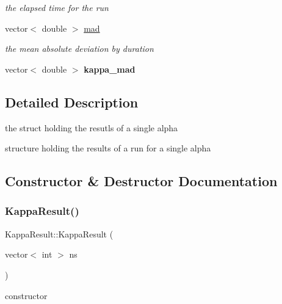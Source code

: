 \begin{DoxyCompactItemize}
\begin{DoxyCompactList}\small\item\em the elapsed time for the run \end{DoxyCompactList}\item 
\mbox{\label{structKappaResult_a43fdcc9f455335e136cb46d2506a14dd}} 
vector$<$ double $>$ \mbox{\hyperlink{structKappaResult_a43fdcc9f455335e136cb46d2506a14dd}{mad}}
\begin{DoxyCompactList}\small\item\em the mean absolute deviation by duration \end{DoxyCompactList}\item 
\mbox{\label{structKappaResult_abdbafd17d772e9821b31905d6389c22f}} 
vector$<$ double $>$ {\bfseries kappa\+\_\+mad}
\end{DoxyCompactItemize}


\subsection{Detailed Description}
the struct holding the resutls of a single alpha 

structure holding the results of a run for a single alpha 

\subsection{Constructor \& Destructor Documentation}
\mbox{\label{structKappaResult_ac0ca82b62ef4f9717ab9e136b251668b}} 
\subsubsection{\texorpdfstring{Kappa\+Result()}{KappaResult()}}
{\footnotesize\ttfamily Kappa\+Result\+::\+Kappa\+Result (\begin{DoxyParamCaption}\item[{vector$<$ int $>$}]{ns }\end{DoxyParamCaption})\hspace{0.3cm}{\ttfamily [inline]}}



constructor 


